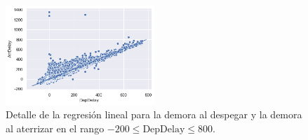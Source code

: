 \begin{figure}[h]
\centering
\includegraphics[width=0.5\textwidth]{img/dep_arr_delay_detalle.png}
\caption{
    Detalle de la regresión lineal para la demora al despegar y la demora al
    aterrizar en el rango $-200 \leq \mathrm{DepDelay} \leq 800$.
}
\end{figure}
